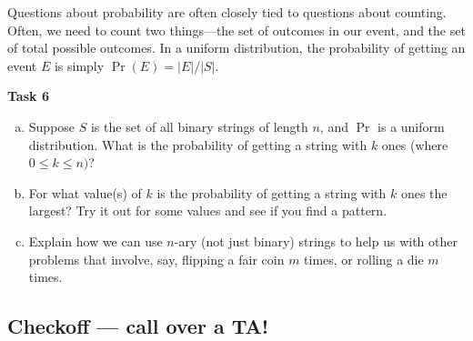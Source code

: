 \documentclass[12pt,letterpaper]{article}
\newenvironment{22enumerate}{\begin{enumerate}[a.]\itemsep0em}{\end{enumerate}}
\newif\ifsol
\newcommand{\solu}[2]{ \begin{mdframed} \ifsol #2 \else \vspace{#1} \fi \end{mdframed} }
\begin{document}
Questions about probability are often closely tied to questions about counting. Often, we need to count two things---the set of outcomes in our event, and the set of total possible outcomes. In a uniform distribution, the probability of getting an event $E$ is simply $\Pr(E) = |E|/|S|$.

\textbf{Task 6}
\begin{22enumerate}
  
\item Suppose $S$ is the set of all binary strings of length $n$, and $\Pr$ is a uniform distribution. What is the probability of getting a string with $k$ ones (where $0 \leq k \leq n)$? 

\solu{2cm}{There are $\binom{n}{k}$ strings with $k$ ones, and $2^n$ total strings, so the answer is $\binom{n}{k}/2^n$.}

\item For what value(s) of $k$ is the probability of getting a string with $k$ ones the largest? Try it out for some values and see if you find a pattern.

\solu{2cm}{When is $\binom{n}{k}$ largest? When $k$ is closest to $\frac{n}{2}$}

\item Explain how we can use $n$-ary (not just binary) strings to help us with other problems that involve, say, flipping a fair coin $m$ times, or rolling a die $m$ times. 

\solu{2cm}{We can form bijections to count things! For example, let 0 denote tail, head denote 1. Then, there is a bijection between the possible binary strings and the possible outcomes of $m$ coin flips. If we were using dice instead, though, we can use a senary (6 valued) string. }

\end{22enumerate}

\subsection*{Checkoff — call over a TA!}
\end{document}
